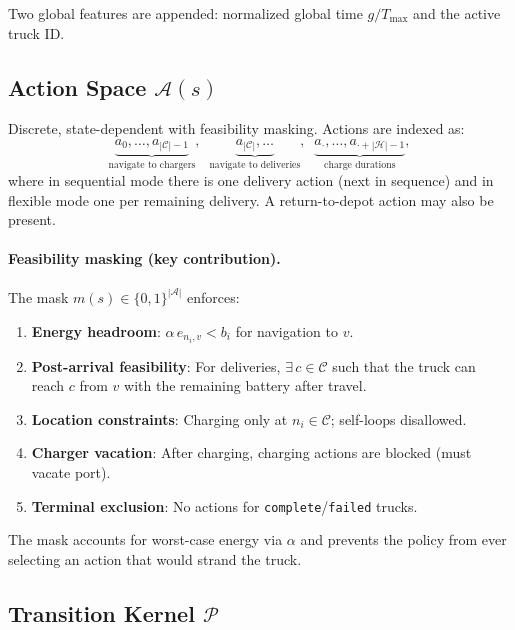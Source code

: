 \documentclass[11pt]{article}
\begin{document}
Two global features are appended: normalized global time $g / T_{\max}$ and the active truck ID.

\subsection{Action Space $\mathcal{A}(s)$}

Discrete, state-dependent with feasibility masking. Actions are indexed as:
\[
\underbrace{a_0,\dots,a_{|\mathcal{C}|-1}}_{\text{navigate to chargers}} ,\;\; \underbrace{a_{|\mathcal{C}|},\dots}_{\text{navigate to deliveries}} ,\;\; \underbrace{a_{\cdot},\dots,a_{\cdot+|\mathcal{H}|-1}}_{\text{charge durations}},
\]
where in sequential mode there is one delivery action (next in sequence) and in flexible mode one per remaining delivery. A return-to-depot action may also be present.

\paragraph{Feasibility masking (key contribution).}
The mask $m(s)\in\{0,1\}^{|\mathcal{A}|}$ enforces:
\begin{enumerate}[nosep]
    \item \textbf{Energy headroom}: $\alpha\,e_{n_i,v} < b_i$ for navigation to $v$.
    \item \textbf{Post-arrival feasibility}: For deliveries, $\exists\, c\in\mathcal{C}$ such that the truck can reach $c$ from $v$ with the remaining battery after travel.
    \item \textbf{Location constraints}: Charging only at $n_i\in\mathcal{C}$; self-loops disallowed.
    \item \textbf{Charger vacation}: After charging, charging actions are blocked (must vacate port).
    \item \textbf{Terminal exclusion}: No actions for \texttt{complete}/\texttt{failed} trucks.
\end{enumerate}
The mask accounts for worst-case energy via $\alpha$ and prevents the policy from ever selecting an action that would strand the truck.

\subsection{Transition Kernel $\mathcal{P}$}
\end{document}
